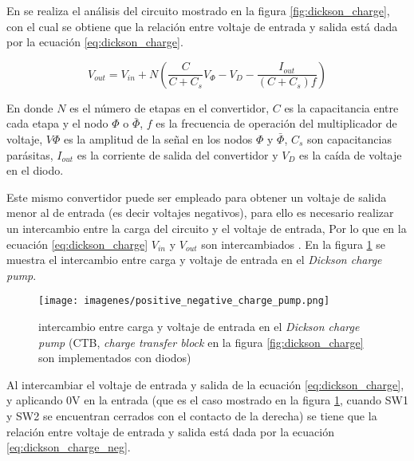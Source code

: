     En \cite{charge_dikson} se realiza el análisis del circuito mostrado
    en la figura \ref{fig:dickson_charge}, con
    el cual se obtiene que la relación entre voltaje de entrada y salida está dada
    por la ecuación \ref{eq:dickson_charge}.

    \begin{equation}
        V_{out} = V_{in} + N \left (  \frac{C}{C+C_s}V_\Phi - V_D - 
        \frac{I_{out}}{(C+C_s)f} \right )
        \label{eq:dickson_charge}
    \end{equation}

    En donde $N$ es el número de etapas en el convertidor, $C$ es la capacitancia
    entre cada etapa y el nodo $\Phi$ o $\bar{\Phi}$, $f$ es la frecuencia de 
    operación del multiplicador de voltaje, $V{\Phi}$ es la amplitud
    de la señal en los nodos $\Phi$ y $\bar{\Phi}$, $C_s$ son capacitancias parásitas,
    $I_{out}$ es la corriente de salida del
    convertidor y $V_D$ es la caída de voltaje en el diodo.

    Este mismo convertidor puede ser empleado para obtener un voltaje de salida
    menor al de entrada (es decir voltajes negativos), para ello es necesario
    realizar un intercambio entre la carga del circuito y el voltaje de entrada,
    Por lo que en la ecuación \ref{eq:dickson_charge} $V_{in}$ y $V_{out}$
    son intercambiados \cite{mohammad_switched_2010}. En la figura 
    \ref{fig:dickson_charge_bid} se muestra el intercambio entre carga y 
    voltaje de entrada en el \textit{Dickson charge pump}.
    
    \begin{figure}[H]
        \centering
        \texttt{[image: imagenes/positive\_negative\_charge\_pump.png]}
        \caption{intercambio entre carga y voltaje de entrada en el
                 \textit{Dickson charge pump} (CTB, \textit{charge transfer
                 block} en la figura \ref{fig:dickson_charge} son implementados
                 con diodos) \cite{mohammad_switched_2010}}
        \label{fig:dickson_charge_bid}
    \end{figure}

    Al intercambiar el voltaje de entrada y salida de la ecuación \ref{eq:dickson_charge},
    y aplicando $0$V en la entrada (que es el caso mostrado en la figura 
    \ref{fig:dickson_charge_bid}, cuando SW1 y SW2 se encuentran cerrados 
    con el contacto de la derecha) se tiene que la relación entre voltaje de entrada
    y salida está dada por la ecuación \ref{eq:dickson_charge_neg}.

